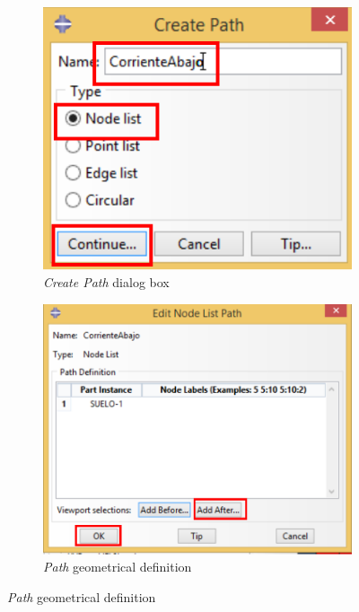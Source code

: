 \begin{itemize}
\begin{figure}[!h]
\begin{subfigure}[!h]{0.40\textwidth}
      \includegraphics[width=\textwidth]{./body/images/post07.pdf}
      \caption{\textit{Create Path} dialog box}
      \label{post07}
    \end{subfigure}%
    \begin{subfigure}[!h]{0.40\textwidth}
      \includegraphics[width=\textwidth]{./body/images/post08.pdf}
      \caption{\textit{Path} geometrical definition}
      \label{post08}
    \end{subfigure}%
    

\end{figure}
\end{itemize}

